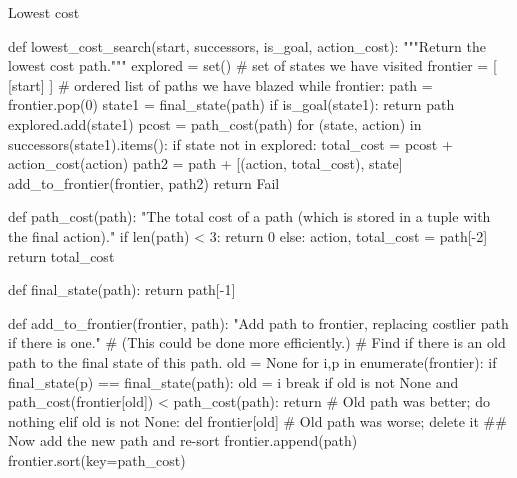 \documentclass{report}
\begin{document}
\begin{algorithm}
\caption{Lowest cost}
\label{python:lowestcost}
\begin{python}
def lowest_cost_search(start, successors, is_goal, action_cost):
    """Return the lowest cost path."""
    explored = set() # set of states we have visited
    frontier = [ [start] ] # ordered list of paths we have blazed
    while frontier:
        path = frontier.pop(0)
        state1 = final_state(path)
        if is_goal(state1):
            return path
        explored.add(state1)
        pcost = path_cost(path)
        for (state, action) in successors(state1).items():
            if state not in explored:
                total_cost = pcost + action_cost(action)
                path2 = path + [(action, total_cost), state]
                add_to_frontier(frontier, path2)
    return Fail

def path_cost(path):
    "The total cost of a path (which is stored in a tuple
    with the final action)."
    if len(path) < 3:
        return 0
    else:
        action, total_cost = path[-2]
        return total_cost

def final_state(path): return path[-1]

def add_to_frontier(frontier, path):
    "Add path to frontier, replacing costlier path if there is one."
    # (This could be done more efficiently.)
    # Find if there is an old path to the final state of this path.
    old = None
    for i,p in enumerate(frontier):
        if final_state(p) == final_state(path):
            old = i
            break
    if old is not None and path_cost(frontier[old]) < path_cost(path):
        return # Old path was better; do nothing
    elif old is not None:
        del frontier[old] # Old path was worse; delete it
    ## Now add the new path and re-sort
    frontier.append(path)
    frontier.sort(key=path_cost)
\end{python}
\end{algorithm}
\end{document}
